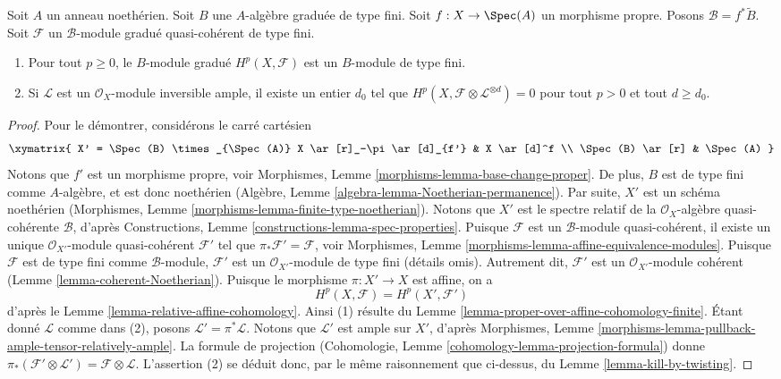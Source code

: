 \begin{lemma}
\label{lemma-graded-finiteness}
Soit $A$ un anneau noethérien.
Soit $B$ une $A$-algèbre graduée de type fini.
Soit $f : X \to \Spec(A)$ un morphisme propre.
Posons $\mathcal{B} = f^*\widetilde B$.
Soit $\mathcal{F}$ un
$\mathcal{B}$-module gradué quasi-cohérent de type fini.
\begin{enumerate}
\item Pour tout $p \geq 0$, le $B$-module gradué $H^p(X, \mathcal{F})$
est un $B$-module de type fini.
\item Si $\mathcal{L}$ est un $\mathcal{O}_X$-module inversible ample,
il existe un entier $d_0$ tel que
$H^p(X, \mathcal{F} \otimes \mathcal{L}^{\otimes d}) = 0$
pour tout $p > 0$ et tout $d \geq d_0$.
\end{enumerate}
\end{lemma}

\begin{proof}
Pour le démontrer, considérons le carré cartésien
$$
\xymatrix{
X' = \Spec(B) \times_{\Spec(A)} X
\ar[r]_-\pi \ar[d]_{f'} &
X \ar[d]^f \\
\Spec(B) \ar[r] &
\Spec(A)
}
$$
Notons que $f'$ est un morphisme propre, voir
Morphismes, Lemme \ref{morphisms-lemma-base-change-proper}.
De plus, $B$ est de type fini comme $A$-algèbre, et est donc
noethérien (Algèbre, Lemme \ref{algebra-lemma-Noetherian-permanence}).
Par suite, $X'$ est un schéma noethérien
(Morphismes, Lemme \ref{morphisms-lemma-finite-type-noetherian}).
Notons que $X'$ est le spectre relatif de la
$\mathcal{O}_X$-algèbre quasi-cohérente $\mathcal{B}$, d'après
Constructions, Lemme \ref{constructions-lemma-spec-properties}.
Puisque $\mathcal{F}$ est un $\mathcal{B}$-module quasi-cohérent,
il existe un unique
$\mathcal{O}_{X'}$-module quasi-cohérent $\mathcal{F}'$ tel que
$\pi_*\mathcal{F}' = \mathcal{F}$, voir
Morphismes, Lemme \ref{morphisms-lemma-affine-equivalence-modules}.
Puisque $\mathcal{F}$ est de type fini comme $\mathcal{B}$-module,
$\mathcal{F}'$ est un
$\mathcal{O}_{X'}$-module de type fini (détails omis). Autrement dit,
$\mathcal{F}'$ est un $\mathcal{O}_{X'}$-module cohérent
(Lemme \ref{lemma-coherent-Noetherian}).
Puisque le morphisme $\pi : X' \to X$ est affine, on a
$$
H^p(X, \mathcal{F}) = H^p(X', \mathcal{F}')
$$
d'après le Lemme \ref{lemma-relative-affine-cohomology}.
Ainsi (1) résulte du
Lemme \ref{lemma-proper-over-affine-cohomology-finite}.
Étant donné $\mathcal{L}$ comme dans (2), posons
$\mathcal{L}' = \pi^*\mathcal{L}$. Notons que $\mathcal{L}'$ est
ample sur $X'$, d'après
Morphismes, Lemme \ref{morphisms-lemma-pullback-ample-tensor-relatively-ample}.
La formule de projection
(Cohomologie, Lemme \ref{cohomology-lemma-projection-formula}) donne
$\pi_*(\mathcal{F}' \otimes \mathcal{L}') = \mathcal{F} \otimes \mathcal{L}$.
L'assertion (2) se déduit donc, par le même raisonnement que ci-dessus, du
Lemme \ref{lemma-kill-by-twisting}.
\end{proof}












